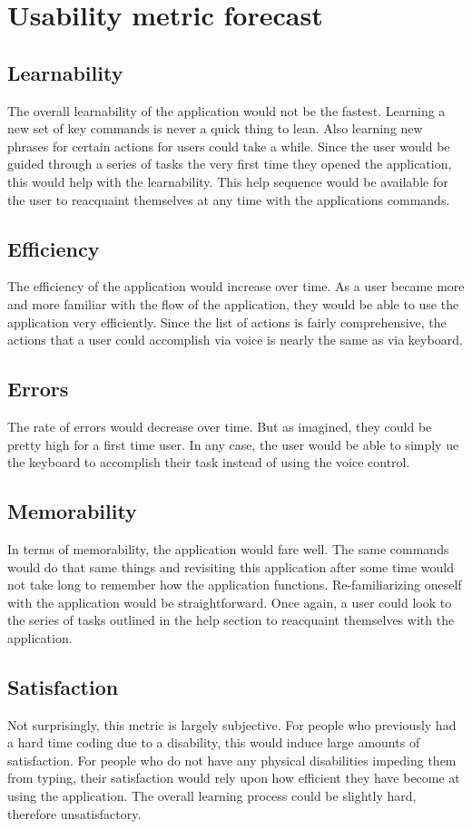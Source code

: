 \documentclass[11pt, oneside]{article}
\begin{document}
\section{Usability metric forecast}

\subsection{Learnability}
The overall learnability of the application would not be the fastest. Learning a new set of key commands is never a quick thing to lean. Also learning new phrases for certain actions for users could take a while. Since the user would be guided through a series of tasks the very first time they opened the application, this would help with the learnability. This help sequence would be available for the user to reacquaint themselves at any time with the applications commands.

\subsection{Efficiency}
The efficiency of the application would increase over time. As a user became more and more familiar with the flow of the application, they would be able to use the application very efficiently. Since the list of actions is fairly comprehensive, the actions that a user could accomplish via voice is nearly the same as via keyboard.

\subsection{Errors}
The rate of errors would decrease over time. But as imagined, they could be pretty high for a first time user. In any case, the user would be able to simply ue the keyboard to accomplish their task instead of using the voice control.

\subsection{Memorability}
In terms of memorability, the application would fare well. The same commands would do that same things and revisiting this application after some time would not take long to remember how the application functions. Re-familiarizing oneself with the application would be straightforward. Once again, a user could look to the series of tasks outlined in the help section to reacquaint themselves with the application.

\subsection{Satisfaction}
Not surprisingly, this metric is largely subjective. For people who previously had a hard time coding due to a disability, this would induce large amounts of satisfaction. For people who do not have any physical disabilities impeding them from typing, their satisfaction would rely upon how efficient they have become at using the application. The overall learning process could be slightly hard, therefore unsatisfactory.
\end{document}
